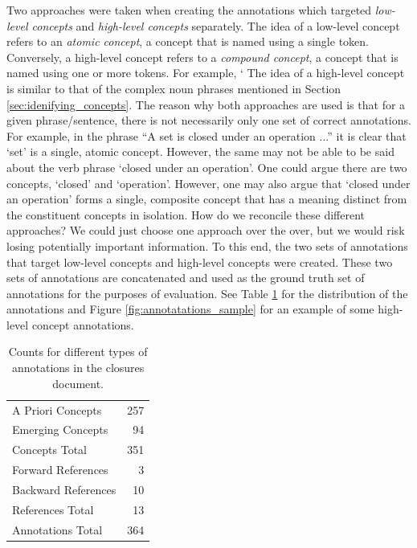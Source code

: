 \documentclass[12pt]{article}
\theoremstyle{grammarstyle}
\begin{document}
Two approaches were taken when creating the annotations which targeted \textit{low-level concepts} and \textit{high-level concepts} separately.
The idea of a low-level concept refers to an \textit{atomic concept}, a concept that is named using a single token.
Conversely, a high-level concept refers to a \textit{compound concept}, a concept that is named using one or more tokens.
For example, `
The idea of a high-level concept is similar to that of the complex noun phrases mentioned in Section \ref{sec:idenifying_concepts}.
The reason why both approaches are used is that for a given phrase/sentence, there is not necessarily only one set of correct annotations.
For example, in the phrase ``A set is closed under an operation ...'' it is clear that `set' is a single, atomic concept. However, the same may not be able to be said about the verb phrase `closed under an operation'. One could argue there are two concepts, `closed' and `operation'. However, one may also argue that `closed under an operation' forms a single, composite concept that has a meaning distinct from the constituent concepts in isolation. How do we reconcile these different approaches? We could just choose one approach over the over, but we would risk losing potentially important information.
To this end, the two sets of annotations that target low-level concepts and high-level concepts were created.
These two sets of annotations are concatenated and used as the ground truth set of annotations for the purposes of evaluation.
See Table \ref{tab:annotations_distribution} for the distribution of the annotations and Figure \ref{fig:annotatations_sample} for an example of some high-level concept annotations.

\begin{table}
    \centering
    \begin{tabular}{|l|r|}
        \hline
        A Priori Concepts & 257  \\
        Emerging Concepts & 94 \\
        Concepts Total & 351 \\
        \hline
        Forward References & 3 \\
        Backward References & 10 \\
        References Total & 13 \\
        \hline
        Annotations Total & 364 \\
        \hline
    \end{tabular}
    \caption{Counts for different types of annotations in the closures document.}
    \label{tab:annotations_distribution}
\end{table}
\end{document}
